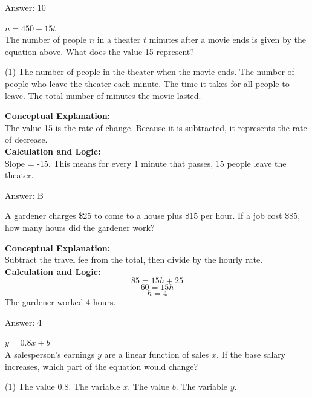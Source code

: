 \documentclass[11pt,paper=a4,answers]{exam}
\begin{document}
\begin{questions}
\begin{solution}
\vspace{15pt}
Answer: \colorbox{yellow!100}{10}
\end{solution}

\question
$n = 450 - 15t$ \\
The number of people $n$ in a theater $t$ minutes after a movie ends is given by the equation above. What does the value 15 represent?
\begin{tasks}(1)
    \task The number of people in the theater when the movie ends.
    \task The number of people who leave the theater each minute.
    \task The time it takes for all people to leave.
    \task The total number of minutes the movie lasted.
\end{tasks}

\begin{solution}
\textbf{Conceptual Explanation:} \\
The value 15 is the rate of change. Because it is subtracted, it represents the rate of decrease.
\\[10pt]
\textbf{Calculation and Logic:} \\
Slope = -15. 
This means for every 1 minute that passes, 15 people leave the theater.

\vspace{15pt}
Answer: \colorbox{yellow!100}{B}
\end{solution}

\question
A gardener charges \$25 to come to a house plus \$15 per hour. If a job cost \$85, how many hours did the gardener work?

\begin{solution}
\textbf{Conceptual Explanation:} \\
Subtract the travel fee from the total, then divide by the hourly rate.
\\[10pt]
\textbf{Calculation and Logic:} \\
\[85 = 15h + 25\]
\[60 = 15h\]
\[h = 4\]
The gardener worked 4 hours.

\vspace{15pt}
Answer: \colorbox{yellow!100}{4}
\end{solution}

\question
$y = 0.8x + b$ \\
A salesperson's earnings $y$ are a linear function of sales $x$. If the base salary increases, which part of the equation would change?
\begin{tasks}(1)
    \task The value 0.8.
    \task The variable $x$.
    \task The value $b$.
    \task The variable $y$.
\end{tasks}


\end{questions}
\end{document}
